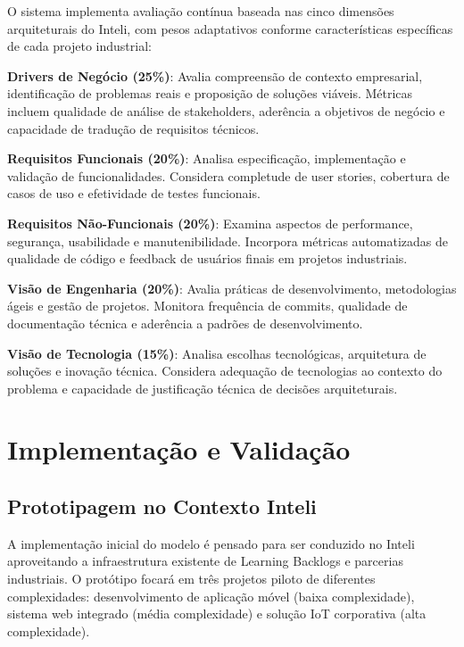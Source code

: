 \documentclass[english, spanish, brazilian]{RBIEarticle} %
\begin{document}
\indent

O sistema implementa avaliação contínua baseada nas cinco dimensões
arquiteturais do Inteli, com pesos adaptativos conforme características
específicas de cada projeto industrial:

\textbf{Drivers de Negócio (25\%)}: Avalia compreensão de contexto empresarial, identificação de problemas reais e proposição de soluções viáveis. Métricas incluem qualidade de análise de stakeholders, aderência a objetivos de negócio e capacidade de tradução de requisitos técnicos.

\textbf{Requisitos Funcionais (20\%)}: Analisa especificação, implementação e validação de funcionalidades. Considera completude de user stories, cobertura de casos de uso e efetividade de testes funcionais.

\textbf{Requisitos Não-Funcionais (20\%)}: Examina aspectos de performance, segurança, usabilidade e manutenibilidade. Incorpora métricas automatizadas de qualidade de código e feedback de usuários finais em projetos industriais.

\textbf{Visão de Engenharia (20\%)}: Avalia práticas de desenvolvimento, metodologias ágeis e gestão de projetos. Monitora frequência de commits, qualidade de documentação técnica e aderência a padrões de desenvolvimento.

\textbf{Visão de Tecnologia (15\%)}: Analisa escolhas tecnológicas, arquitetura de soluções e inovação técnica. Considera adequação de tecnologias ao contexto do problema e capacidade de justificação técnica de decisões arquiteturais.

\section{Implementação e Validação}

\subsection{Prototipagem no Contexto Inteli}

\indent

A implementação inicial do modelo é pensado para ser conduzido no Inteli
aproveitando a infraestrutura existente de Learning Backlogs e parcerias
industriais. O protótipo focará em três projetos piloto de diferentes
complexidades: desenvolvimento de aplicação móvel (baixa complexidade), sistema
web integrado (média complexidade) e solução IoT corporativa (alta
complexidade).
\end{document}
